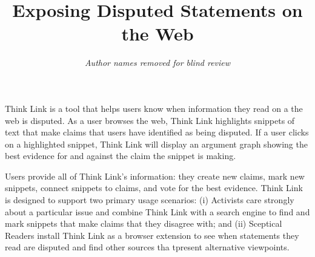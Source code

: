 \documentclass{chi2009}
\begin{document}

\toappear{}



\title{Exposing Disputed Statements on the Web}


\author{
\parbox[t]{9cm}{\centering
	     {\em Author names removed for blind review}\\
}
}

\maketitle


\abstract
Think Link is a tool that helps users know when information they read on a the web is disputed. As a user browses the web, Think Link highlights snippets of text that make claims that users have identified as being disputed. If a user clicks on a highlighted snippet, Think Link will display an argument graph showing the best evidence for and against the claim the snippet is making.

Users provide all of Think Link's information: they create new claims, mark new snippets, connect snippets to claims, and vote for the best evidence.
Think Link is designed to support two primary usage scenarios: (i) Activists care strongly about a particular issue and combine Think Link with a search engine to find and mark snippets that make claims that they disagree with; and (ii) Sceptical Readers install Think Link as a browser extension to see when statements they read are disputed and find other sources tha tpresent alternative viewpoints.

\end{document}
